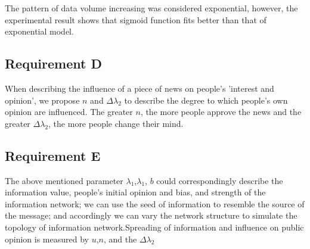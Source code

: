 The pattern of data volume increasing was considered exponential, however, the experimental result shows that sigmoid function fits better than that of exponential model. 
\subsection{Requirement D}
When describing the influence of a piece of news on people's 'interest and opinion', we propose $n$ and $\Delta\lambda_2$ to describe the degree to which people's own opinion are influenced. The greater $n$, the more people approve the news and the greater $\Delta\lambda_2$, the more people change their mind.
\subsection{Requirement E}
The above mentioned parameter $\lambda_1$,$\lambda_1$, $b$ could correspondingly describe the information value, people’s initial opinion and bias, and strength of the information network; we can use the seed of information to resemble the source of the message; and accordingly we can vary the network structure to simulate the topology of information network.Spreading of information and influence on public opinion is measured by $u$,$n$, and the 
$\Delta\lambda_2$